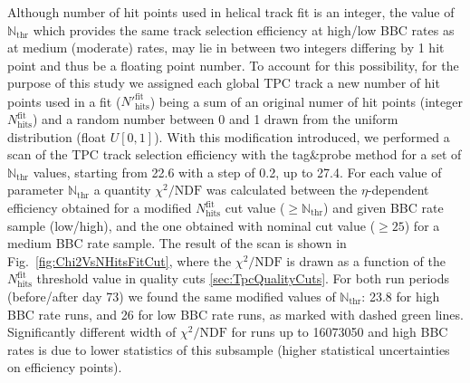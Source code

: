 Although number of hit points used in helical track fit is an integer, the value of $\mathbb{N}_{\text{thr}}$ which provides the same track selection efficiency at high/low BBC rates as at medium (moderate) rates, may lie in between two integers differing by 1 hit point and thus be a floating point number. To account for this possibility, for the purpose of this study we assigned each global TPC track a new number of hit points used in a fit (${N'}_{\text{hits}}^{\text{fit}}$) being a sum of an original numer of hit points (integer $N_{\text{hits}}^{\text{fit}}$) and a random number between 0 and 1 drawn from the uniform distribution (float $U[0,1]$). With this modification introduced, we performed a scan of the TPC track selection efficiency with the tag\&probe method for a set of $\mathbb{N}_{\text{thr}}$ values, starting from 22.6 with a step of 0.2, up to 27.4. For each value of parameter $\mathbb{N}_{\text{thr}}$ a quantity $\chi^{2}/\text{NDF}$ was calculated between the $\eta$-dependent efficiency obtained for a modified $N_{\text{hits}}^{\text{fit}}$ cut value ($\geq\mathbb{N}_{\text{thr}}$) and given BBC rate sample (low/high), and the one obtained with nominal cut value ($\geq25$) for a medium BBC rate sample. The result of the scan is shown in Fig.~\ref{fig:Chi2VsNHitsFitCut}, where the $\chi^{2}/\text{NDF}$ is drawn as a function of the $N_{\text{hits}}^{\text{fit}}$ threshold value in quality cuts \ref{sec:TpcQualityCuts}. For both run periods (before/after day 73) we found the same modified values of $\mathbb{N}_{\text{thr}}$: 23.8 for high BBC rate runs, and 26 for low BBC rate runs, as marked with dashed green lines. Significantly different width of $\chi^{2}/\text{NDF}$ for runs up to 16073050 and high BBC rates is due to lower statistics of this subsample (higher statistical uncertainties on efficiency points).

